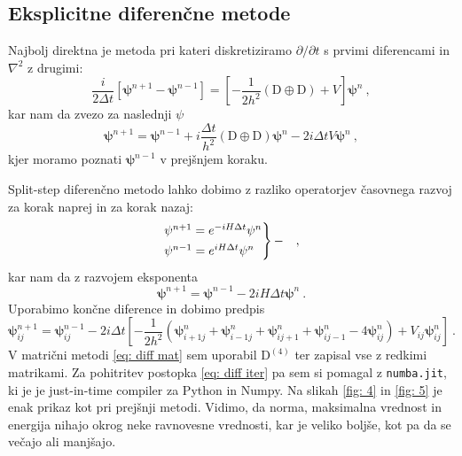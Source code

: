 \documentclass[11pt]{report}
\newcommand{\p}{\partial}
\newcommand{\D}{\text{D}}
\newcommand{\vpsin}{\mathbf{\psi}^n}
\newcommand{\vpsinn}{\mathbf{\psi}^{n+1}}
\newcommand{\vpsimm}{\mathbf{\psi}^{n-1}}
\begin{document}
\newpage

\subsection{Eksplicitne diferenčne metode}
Najbolj direktna je metoda pri kateri diskretiziramo $\p/\p t$ s prvimi diferencami in $\nabla^2$ z drugimi:
\begin{equation}
	\frac{i}{2\Delta t} \left [ \vpsinn - \vpsimm \right ] = \left [ -\frac{1}{2h^2} (\D \oplus \D) + V \right ] \vpsin \>,
\end{equation}
kar nam da zvezo za naslednji $\psi$
\begin{equation}
	\label{eq: diff mat}
	\vpsinn = \vpsimm + i \frac{\Delta t}{h^2} (\D \oplus \D) \vpsin - 2i \Delta t V \vpsin \>,
\end{equation}
kjer moramo poznati $\vpsimm$ v prejšnjem koraku.

Split-step diferenčno metodo lahko dobimo z razliko operatorjev časovnega razvoj za korak naprej in za korak nazaj:
\begin{equation}
	\begin{rcases}
		\vpsinn = e^{-i H \Delta t} \vpsin \\
		\vpsimm = e^{i H \Delta t} \vpsin
		\>\>
	\end{rcases}
	- \quad,
\end{equation}
kar nam da z razvojem eksponenta
\begin{equation}
	\vpsinn = \vpsimm - 2i H\Delta t \vpsin \>.
\end{equation}
Uporabimo končne diference in dobimo predpis
\begin{equation}
	\label{eq: diff iter}
	\vpsinn_{ij} = \vpsimm_{ij} - 2i \Delta t \left [ -\frac{1}{2h^2} \left ( \vpsin_{i+1j} + \vpsin_{i-1j} + \vpsin_{ij+1} + \vpsin_{ij-1} - 4 \vpsin_{ij} \right ) + V_{ij} \vpsin_{ij} \right ] \>.
\end{equation}
V matrični metodi \ref{eq: diff mat} sem uporabil $\D^{(4)}$ ter zapisal vse z redkimi matrikami.
Za pohitritev postopka \ref{eq: diff iter} pa sem si pomagal z \texttt{numba.jit}, ki je je just-in-time compiler
za Python in Numpy.
Na slikah \ref{fig: 4} in \ref{fig: 5} je enak prikaz kot pri prejšnji metodi. Vidimo, da norma,
maksimalna vrednost in energija nihajo okrog neke ravnovesne vrednosti, kar je veliko boljše, kot pa da se večajo ali
manjšajo.

\vspace*{-0.3cm}
\end{document}
